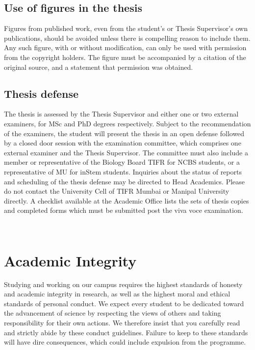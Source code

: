 \documentclass[a4paper]{extarticle}
\begin{document}
\subsection{Use of figures in the thesis} 
Figures from published work, even from the student’s or
Thesis Supervisor’s own publications, should be avoided unless there is compelling reason
to include them. Any such figure, with or without modification, can only be used with
permission from the copyright holders. The figure must be accompanied by a citation of the
original source, and a statement that permission was obtained.

\subsection{Thesis defense}
The thesis is assessed by the Thesis Supervisor and either one or two
external examiners, for MSc and PhD degrees respectively. Subject to the recommendation
of the examiners, the student will present the thesis in an open defense followed by a closed
door session with the examination committee, which comprises one external examiner and
the Thesis Supervisor. The committee must also include a member or representative of the
Biology Board TIFR for NCBS students, or a representative of MU for inStem students.
Inquiries about the status of reports and scheduling of the thesis defense may be directed to
Head Academics. Please do not contact the University Cell of TIFR Mumbai or Manipal
University directly. A checklist available at the Academic Office lists the sets of thesis
copies and completed forms which must be submitted post the viva voce examination.
	
  
\section{Academic Integrity}
Studying and working on our campus requires the highest standards of honesty and
academic integrity in research, as well as the highest moral and ethical standards of personal
conduct. We expect every student to be dedicated toward the advancement of science by
respecting the views of others and taking responsibility for their own actions. We therefore
insist that you carefully read and strictly abide by these conduct guidelines. Failure to keep
to these standards will have dire consequences, which could include expulsion from the
programme.
\end{document}
